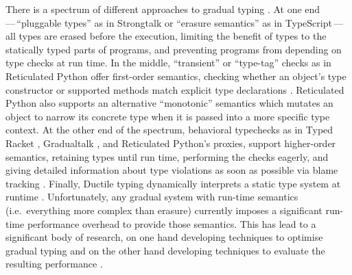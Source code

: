 \documentclass[sigplan,10pt,review,screen]{acmart}\settopmatter{printfolios=true}
\begin{document}
There is a spectrum of different approaches to gradual typing
\cite{kafka18,bensurvey18icfp}.
At one end\,---\,``pluggable types'' as in Strongtalk \cite{strongtalk} or ``erasure
semantics'' as in 
TypeScript\citep{typeScriptECOOP}\,---\,
%
all types are erased before the execution, limiting the benefit of
types to the statically typed parts of programs, and preventing
programs from depending on type checks at run time.  In the middle,
``transient'' or ``type-tag'' checks as in Reticulated Python 
offer first-order semantics, checking
whether an object's type constructor or supported methods match
explicit type declarations
\cite{Siek2007,Bloom2009,concrete15,reticPython2014,Greenman2018}.
Reticulated Python also supports an alternative ``monotonic'' semantics
which mutates an object to narrow its concrete type when it is passed
into a more specific type context.
At the other end of the spectrum, behavioral
typechecks as in Typed Racket \cite{typedScheme08,takikawa2012},
Gradualtalk \cite{gradualtalk14},
and Reticulated Python's proxies,
support higher-order semantics, retaining
types until run 
time, performing the checks eagerly, and giving detailed information
about type violations as soon as possible via blame
tracking \cite{blame2009,blameForAll2011}.
Finally, Ductile typing
dynamically interprets a static type system at runtime
\cite{Ductile2011}.
%
%
Unfortunately, any gradual system with run-time semantics
(i.e.\ everything more complex than erasure) currently
imposes a significant run-time performance overhead to provide those
semantics.  This has lead to a significant body of research,
on one hand developing techniques to optimise gradual typing 
\citep{Vitousek2017,Muehlboeck2017,Bauman2017,Richards2017,Greenman2018}
and on the other hand developing techniques to evaluate the
resulting performance  \cite{takikawa2016,Greenman2019jfp}.
\end{document}
